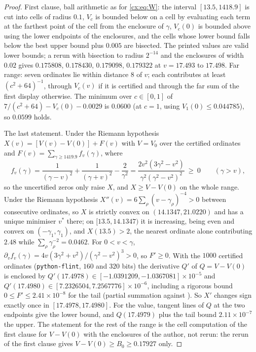 \begin{proof}
First clause, ball arithmetic as for \eqref{cx:eq:W}: the interval $[13.5,1418.9]$ is cut into cells of radius $0.1$, $V_c$ is bounded below on a cell by evaluating each term at the farthest point of the cell from the enclosure of $\gamma$, $V_c(0)$ is bounded above using the lower endpoints of the enclosures, and the cells whose lower bound falls below the best upper bound plus $0.005$ are bisected. The printed values are valid lower bounds; a rerun with bisection to radius $2^{-14}$ and the enclosures of width $0.02$ gives $0.175808$, $0.178430$, $0.179098$, $0.179322$ at $v=17.493$ to $17.498$. Far range: seven ordinates lie within distance $8$ of $v$; each contributes at least $(c^2+64)^{-1}$, through $V_c(v)$ if it is certified and through the far sum of the first display otherwise. The minimum over $c\in[0,1]$ of $7/(c^2+64)-V_c(0)-0.0029$ is $0.0600$ (at $c=1$, using $V_1(0)\le0.044785$), so $0.0599$ holds.

The last statement. Under the Riemann hypothesis $X(v)=[V(v)-V(0)]+F(v)$ with $V=V_0$ over the certified ordinates and $F(v)=\sum_{\gamma\ge1419.9}f_v(\gamma)$, where
\[
f_v(\gamma)=\frac1{(\gamma-v)^2}+\frac1{(\gamma+v)^2}-\frac2{\gamma^2}=\frac{2v^2(3\gamma^2-v^2)}{\gamma^2(\gamma^2-v^2)^2}\ \ge\ 0\qquad(\gamma>v),
\]
so the uncertified zeros only raise $X$, and $X\ge V-V(0)$ on the whole range. Under the Riemann hypothesis $X''(v)=6\sum_\rho(v-\gamma_\rho)^{-4}>0$ between consecutive ordinates, so $X$ is strictly convex on $(14.1347,21.0220)$ and has a unique minimiser $v^*$ there; on $[13.5,14.1347)$ it is increasing, being even and convex on $(-\gamma_1,\gamma_1)$, and $X(13.5)>2$, the nearest ordinate alone contributing $2.48$ while $\sum_\rho\gamma_\rho^{-2}=0.0462$. For $0<v<\gamma$, $\partial_vf_v(\gamma)=4v(3\gamma^2+v^2)/(\gamma^2-v^2)^3>0$, so $F'\ge0$. With the $1000$ certified ordinates (\texttt{python-flint}, $160$ and $320$ bits) the derivative $Q'$ of $Q=V-V(0)$ is enclosed by $Q'(17.4978)\in[-1.0391209,-1.0367081]\times10^{-5}$ and $Q'(17.4980)\in[7.2326504,7.2567776]\times10^{-6}$, including a rigorous bound $0\le F'\le2.41\times10^{-8}$ for the tail (partial summation against \cite{HSW22}). So $X'$ changes sign exactly once in $[17.4978,17.4980]$. For the value, tangent lines of $Q$ at the two endpoints give the lower bound, and $Q(17.4979)$ plus the tail bound $2.11\times10^{-7}$ the upper. The statement for the rest of the range is the cell computation of the first clause for $V-V(0)$ with the enclosures of the author, not rerun: the rerun of the first clause gives $V-V(0)\ge B_0\ge0.17927$ only.
\end{proof}

